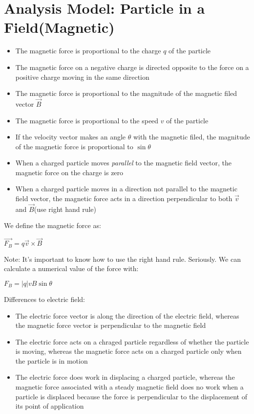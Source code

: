 \documentclass[12pt]{report}
\begin{document}
	\section{Analysis Model: Particle in a Field(Magnetic)}
		\begin{itemize}
			\item The magnetic force is proportional to the charge $q$ of the particle
			\item The magnetic force on a negative charge is directed opposite to the force on a positive charge moving in the same direction
			\item The magnetic force is proportional to the magnitude of the magnetic filed vector \textbf{$\vec{B}$}
			\item The magnetic force is proportional to the speed $v$ of the particle
			\item If the velocity vector makes an angle $\theta$ with the magnetic filed, the magnitude of the magnetic force is proportional to $\sin \theta$
			\item When a charged particle moves \textit{parallel} to the magnetic field vector, the magnetic force on the charge is zero
			\item When a charged particle moves in a direction not parallel to the magnetic field vector, the magnetic force acts in a direction perpendicular to both \textbf{$\vec{v}$} and \textbf{$\vec{B}$}(use right hand rule)
		\end{itemize}
		We define the magnetic force as:\\
		\centerline{$\vec{F_B} = q\vec{v} \times \vec{B}$}
		Note: It's important to know how to use the right hand rule. Seriously. We can calculate a numerical value of the force with:\\
		\centerline{$F_B = |q| vB \sin \theta$}
		Differences to electric field:
		\begin{itemize}
			\item The electric force vector is along the direction of the electric field, whereas the magnetic force vector is perpendicular to the magnetic field
			\item The electric force acts on a chraged particle regardless of whether the particle is moving, whereas the magnetic force acts on a charged particle only when the particle is in motion
			\item The electric force does work in displacing a charged particle, whereas the magnetic force associated with a steady magnetic field does no work when a particle is displaced because the force is perpendicular to the displacement of its point of application
		\end{itemize}
\end{document}
